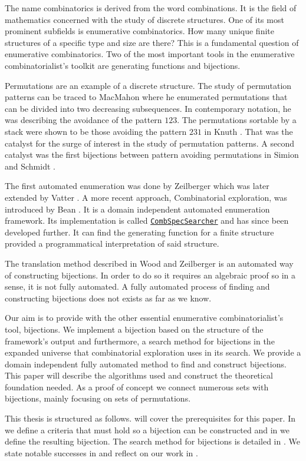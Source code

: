 \label{ch:introduction}
The name combinatorics is derived from the word combinations. It is the field of mathematics concerned with the study of discrete structures. One of its most prominent subfields is enumerative combinatorics. How many unique finite structures of a specific type and size are there? This is a fundamental question of enumerative combinatorics. Two of the most important tools in the enumerative combinatorialist's toolkit are generating functions and bijections.

Permutations are an example of a discrete structure. The study of permutation patterns can be traced to MacMahon \cite{MacMahon} where he enumerated permutations that can be divided into two decreasing subsequences. In contemporary notation, he was describing the avoidance of the pattern $123$. The permutations sortable by a stack were shown to be those avoiding the pattern $231$ in Knuth \cite{knuth:aocp1}. That was the catalyst for the surge of interest in the study of permutation patterns. A second catalyst was the first bijections between pattern avoiding permutations in Simion and Schmidt \cite{simionandschmidt}. 

The first automated enumeration was done by Zeilberger \cite{Zeilberger1998EnumerationSA} which was later extended by Vatter \cite{vatter_2008}. A more recent approach, Combinatorial exploration, was introduced by Bean \cite{BeanPhd:phd}. It is a domain independent automated enumeration framework. Its implementation is called \href{https://github.com/PermutaTriangle/comb_spec_searcher}{\texttt{CombSpecSearcher}} and has since been developed further. It can find the generating function for a finite structure provided a programmatical interpretation of said structure.

The translation method described in Wood and Zeilberger \cite{wood_zeilberger} is an automated way of constructing bijections. In order to do so it requires an algebraic proof so in a sense, it is not fully automated. A fully automated process of finding and constructing bijections does not exists as far as we know.

Our aim is to provide \css{} with the other essential enumerative combinatorialist's tool, bijections. We implement a bijection based on the structure of the framework's output and furthermore, a search method for bijections in the expanded universe that combinatorial exploration uses in its search. We provide a domain independent fully automated method to find and construct bijections. This paper will describe the algorithms used and construct the theoretical foundation needed. As a proof of concept we connect numerous sets with bijections, mainly focusing on sets of permutations.

This thesis is structured as follows.  will cover the prerequisites for this paper. In  we define a criteria that must hold so a bijection can be constructed and in  we define the resulting bijection. The search method for bijections is detailed in . We state notable successes in  and reflect on our work in .
